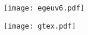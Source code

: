 \documentclass[preview]{standalone}
\begin{document}
\begin{minipage}{0.46\textwidth} {\centering \texttt{[image: egeuv6.pdf]}} \end{minipage} 
\begin{minipage}{0.08\textwidth} {} \end{minipage} 
\begin{minipage}{0.46\textwidth} {\centering \texttt{[image: gtex.pdf]}} \end{minipage}
\end{document}

